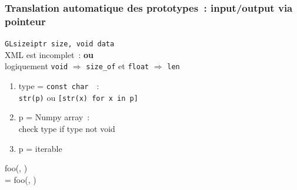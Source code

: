 \begin{frame}
  \frametitle{Translation automatique des prototypes~: input/output via pointeur}
  \texttt{GLsizeiptr size,  void  data} \\[.5em]
  \attention{} \alert{XML est incomplet~:  \textbf{ou} } \\
  logiquement \texttt{void} $\Longrightarrow$ \texttt{size\_of} et \texttt{float} $\Longrightarrow$ \texttt{len}
  \vspace{.5em}
  \begin{enumerate}
  \item type = \texttt{const char \ptr\ptr}~:\\
    \texttt{str(p)} ou \texttt{[str(x) for x in p]}
  \item p = Numpy array~:\\
    check type if type not void
  \item p = iterable
  \end{enumerate}
  \vspace{.5em}
   foo(, ) \\
   = foo(, )
\end{frame}

